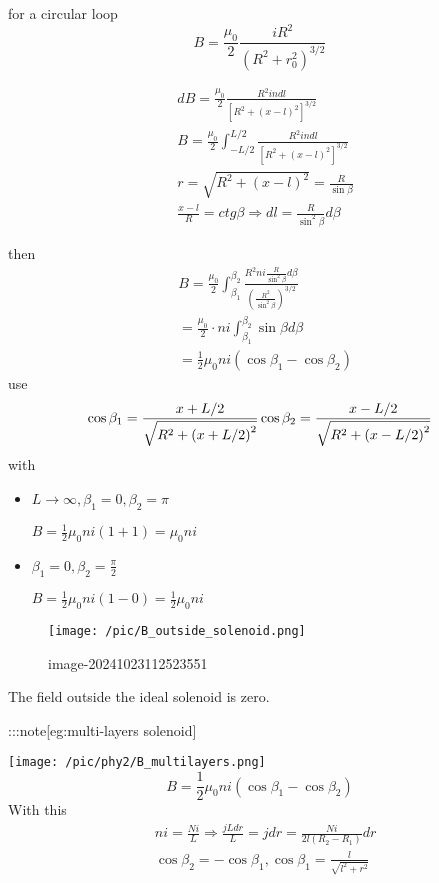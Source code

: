 \documentclass[
]{article}
\begin{document}
for a circular loop \[
B=\frac{\mu_0}{2}\frac{iR^2}{\left(R^2+r_0^2\right)^{3/2}}
\]

\[
\begin{aligned}
&dB=\frac{\mu_{0}}{2}\frac{R^{2}indl}{\left[R^{2}+(x-l)^{2}\right]^{3/2}} \\
&B=\frac{\mu_{0}}{2}\int_{-L/2}^{L/2}\frac{R^{2}indl}{\left[R^{2}+\left(x-l\right)^{2}\right]^{3/2}} \\
&r={\sqrt{R^{2}+\left(x-l\right)^{2}}}={\frac{R}{\sin\beta}} \\
&\frac{x-l}{R}=ctg\beta\Rightarrow dl=\frac{R}{\sin^{2}\beta}d\beta 
\end{aligned}
\]

then \[
\begin{aligned}
&B=\frac{\mu_{0}}{2}\int_{\beta_{1}}^{\beta_{2}}\frac{R^{2}ni\frac{R}{\sin^{2}\beta}d\beta}{(\frac{R^{2}}{\sin^{2}\beta})^{3/2}} \\
&=\frac{\mu_{0}}{2}\cdot ni\int_{\beta_{1}}^{\beta_{2}}\sin\beta d\beta \\
&=\frac12 \mu_{0}ni(\cos\beta_{1}-\cos\beta_{2})
\end{aligned}
\] use \[
\cos\beta_{1}=\frac{x+L/2}{\sqrt{R^{2}+\left(x+L/2\right)^{2}}}\\\cos\beta_{2}=\frac{x-L/2}{\sqrt{R^{2}+\left(x-L/2\right)^{2}}}
\] with

\begin{itemize}
\item
  \(L\to \infty ,\beta _1=0,\beta_2=\pi\)

  \(B=\frac{1}{2}\mu _0ni(1+1)=\mu_0ni\)
\item
  \(\beta _1=0,\beta_2=\frac{\pi}{2}\)

  \(B=\frac{1}{2}\mu_0 n i(1-0)=\frac{1}{2}\mu_0 ni\)
\end{itemize}

\begin{figure}
\centering
\texttt{[image: /pic/B\_outside\_solenoid.png]}
\caption{image-20241023112523551}
\end{figure}

The field outside the ideal solenoid is zero.

:::note{[}eg:multi-layers solenoid{]}

\texttt{[image: /pic/phy2/B\_multilayers.png]} \[
B=\frac12 \mu_{0}ni(\cos\beta_{1}-\cos\beta_{2})
\] With this \[
\begin{aligned}&ni=\frac{Ni}{L}\Rightarrow\frac{jLdr}{L}=jdr=\frac{Ni}{2l(R_{2}-R_{1})} dr\\&\cos\beta_{2}=-\cos\beta_{1},\cos\beta_{1}=\frac{l}{\sqrt{l^{2}+r^{2}}}\end{aligned}
\]
\end{document}
